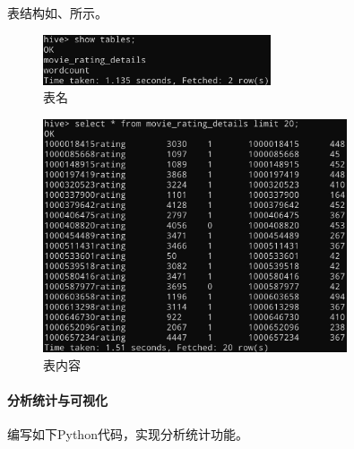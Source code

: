\documentclass[lang=cn,11pt,a4paper,cite=authornum]{paper}
\begin{document}
表结构如、所示。

\begin{figure}[!htb]
    \centering
    \includegraphics[width=0.6\textwidth]{./images/5.jpg}
    \caption{表名\label{fig:5}}
\end{figure}

\begin{figure}[!htb]
    \centering
    \includegraphics[width=0.8\textwidth]{./images/6.jpg}
    \caption{表内容\label{fig:6}}
\end{figure}

\paragraph{分析统计与可视化}

编写如下Python代码，实现分析统计功能。
\end{document}
